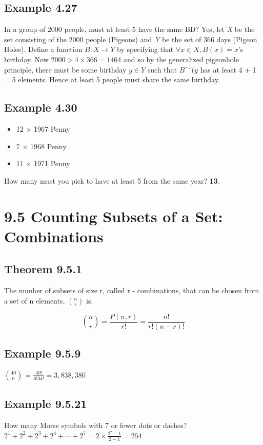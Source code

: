 \documentclass{article}
\begin{document}
\subsection*{Example 4.27}
In a group of 2000 people, must at least 5 have the same BD? Yes, let \textit{X} be the set consisting of the 2000 people (Pigeons) and \textit{Y} be the set of 366 days (Pigeon Holes). Define a function $B: X \rightarrow Y$ by specifying that $\forall x \in X, B(x) = x$'s birthday. Now $2000 > 4 \times 366 = 1464$ and so by the generalized pigeonhole principle, there must be some birthday $y \in Y$ such that $B^{-1}(y$ has at least 4 + 1 = 5 elements. Hence at least 5 people must share the same birthday.

\subsection*{Example 4.30}
\begin{itemize}
\item 12 $\times$ 1967 Penny
\item 7 $\times$ 1968 Penny
\item 11 $\times$ 1971 Penny
\end{itemize}

\noindent
How many must you pick to have at least 5 from the same year? \textbf{13}.

\section*{9.5 Counting Subsets of a Set: Combinations}
\subsection*{Theorem 9.5.1}
The number of subsets of size r, called r - combinations, that can be chosen from a set of n elements, $n \choose r$ is.

\begin{equation}
{n \choose r} = \frac{P(n, r)}{r!} = \frac{n!}{r!(n - r)!}
\end{equation}


\subsection*{Example 9.5.9}
$40 \choose 6$ = $\frac{40!}{6!34!} = 3,838,380$

\subsection*{Example 9.5.21}
How many Morse symbols with 7 or fewer dots or dashes?
$2^1 + 2^2 + 2^3 + 2^4 + \cdots + 2^7 = 2 \times \frac{2^7 - 1}{2 - 1} = 254$
\end{document}
